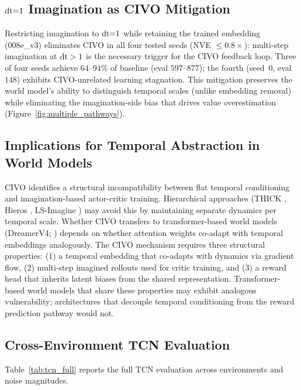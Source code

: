 \subsection{\texorpdfstring{$\mathrm{dt}{=}1$}{dt=1} Imagination as CIVO Mitigation}
\label{sec:pathways}

Restricting imagination to $\mathrm{dt}{=}1$ while retaining the trained embedding (008e\_v3) eliminates CIVO in all four tested seeds (NVE $\leq 0.8\times$): multi-step imagination at $\mathrm{dt} > 1$ is the necessary trigger for the CIVO feedback loop. Three of four seeds achieve $64$--$94\%$ of baseline (eval $597$--$877$); the fourth (seed~0, eval $148$) exhibits CIVO-unrelated learning stagnation. This mitigation preserves the world model's ability to distinguish temporal scales (unlike embedding removal) while eliminating the imagination-side bias that drives value overestimation (Figure~\ref{fig:multiple_pathways}).


\subsection{Implications for Temporal Abstraction in World Models}
\label{sec:implications}

CIVO identifies a structural incompatibility between flat temporal conditioning and imagination-based actor-critic training.  Hierarchical approaches (THICK \citep{gumbsch2024thick}, Hieros \citep{mattes2024hieros}, LS-Imagine \citep{li2025lsimagine}) may avoid this by maintaining separate dynamics per temporal scale.  Whether CIVO transfers to transformer-based world models (DreamerV4; \citet{hafner2025dreamerv4}) depends on whether attention weights co-adapt with temporal embeddings analogously.  The CIVO mechanism requires three structural properties: (1) a temporal embedding that co-adapts with dynamics via gradient flow, (2) multi-step imagined rollouts used for critic training, and (3) a reward head that inherits latent biases from the shared representation.  Transformer-based world models that share these properties may exhibit analogous vulnerability; architectures that decouple temporal conditioning from the reward prediction pathway would not.

\subsection{Cross-Environment TCN Evaluation}
\label{sec:tcn_cross_env}

Table~\ref{tab:tcn_full} reports the full TCN evaluation across environments and noise magnitudes.

